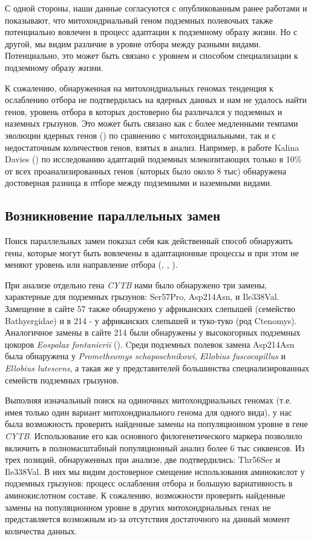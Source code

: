  
С одной стороны, наши данные согласуются с опубликованным ранее работами и показывают, что митохондриальный геном подземных полевочьих также потенциально вовлечен в процесс адаптации к подземному образу жизни. Но с другой, мы видим различие в уровне отбора между разными видами. Потенциально, это может быть связано с уровнем и способом специализации к подземному образу жизни.

 
К сожалению, обнаруженная на митохондриальных геномах тенденция к ослаблению отбора не подтвердилась на ядерных данных и нам не удалось найти генов, уровень отбора в которых достоверно бы различался у подземных и наземных грызунов. Это может быть связано как с более медленными темпами эволюции ядерных генов (\cite{Lin2004}) по сравнению с митохондриальными, так и с недостаточным количествов генов, взятых в анализ. Например, в работе Kalina Davies (\cite{Davies2018}) по исследованию адаптаций подземных млекопитающих только в 10\% от всех проанализированных генов (которых было около 8 тыс) обнаружена достоверная разница в отборе между подземными и наземными видами.    


\subsection{Возникновение параллельных замен}

Поиск параллельных замен показал себя как действенный способ обнаружить гены, которые могут быть вовлечены в адаптационные процессы и при этом не меняют уровень или направление отбора (\cite{Davies2018}, \cite{Zhou2015}, \cite{Sackman2017}). 

При анализе отдельно гена \textit{CYTB} нами было обнаружено три замены, характерные для подземных грызунов: Ser57Pro, Asp214Asn, и Ile338Val. Замещение в сайте 57 также обнаружено у африканских слепышей (семейство Bathyergidae) и в 214 - у африканских слепышей и туко-туко (род Ctenomys). Аналогичное замены в сайте 214 были обнаружены у высокогорных подземных цокоров \textit{Eospalax fontanierii} (\cite{Cooper1993}). Cреди подземных полевок замена Asp214Asn была обнаружена у \textit{Prometheomys schaposchnikowi}, \textit{Ellobius fuscocapillus} и \textit{Ellobius lutescens}, а такая же у представителей большинства специализированных семейств подземных грызунов.

Выполняя изначальный поиск на одиночных митохондриальных геномах (т.е. имея только один вариант митохондриального генома для одного вида), у нас была возможность проверить найденные замены на популяционном уровне в гене \textit{CYTB}. Использование его как основного филогенетического маркера позволило включить в полномасштабный популяционный анализ более 6 тыс сиквенсов. Из трех позиций, обнаруженных при анализе, две подтвердились: Thr56Ser и Ile338Val. В них мы видим достоверное смещение использования аминокислот у подземных грызунов: процесс ослабления отбора и большую вариативность в аминокислотном составе. К сожалению, возможности проверить найденные замены на популяционном уровне в других митохондриальных генах не представляется возможным из-за отсутствия достаточного на данный момент количества данных. 


